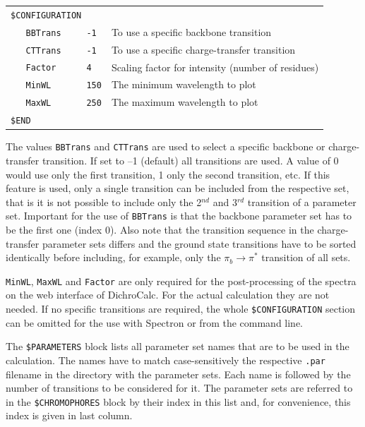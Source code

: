 \documentclass[11pt, letterpaper]{article}
\begin{document}
{\small
\begin{tabular}{p{5cm}p{12cm}}
\verb'$CONFIGURATION'          &                                                   \\
\verb'   BBTrans     -1'       & To use a specific backbone transition             \\
\verb'   CTTrans     -1'       & To use a specific charge-transfer transition      \\
\verb'   Factor      4'        & Scaling factor for intensity (number of residues) \\
\verb'   MinWL       150'      & The minimum wavelength to plot                    \\
\verb'   MaxWL       250'      & The maximum wavelength to plot                    \\
\verb'$END'                    &                                                   \\
\end{tabular}
}

The values \verb'BBTrans' and \verb'CTTrans' are used to select a specific backbone or charge-transfer transition. If set to --1 (default) all transitions are used. A value of 0 would use only the first transition, 1 only the second transition, etc. If this feature is used, only a single transition can be included from the respective set, that is it is not possible to include only the 2$^{nd}$ and 3$^{rd}$ transition of a parameter set. Important for the use of \verb'BBTrans' is that the backbone parameter set has to be the first one (index 0). Also note that the transition sequence in the charge-transfer parameter sets differs and the ground state transitions have to be sorted identically before including, for example, only the $\pi_b\rightarrow\pi^*$ transition of all sets.

\verb'MinWL', \verb'MaxWL' and \verb'Factor' are only required for the post-processing of the spectra on the web interface of DichroCalc. For the actual calculation they are not needed. If no specific transitions are required, the whole \verb'$CONFIGURATION' section can be omitted for the use with Spectron or from the command line.

The \verb'$PARAMETERS' block lists all parameter set names that are to be used in the calculation. The names have to match case-sensitively the respective \verb'.par' filename in the directory with the parameter sets. Each name is followed by the number of transitions to be considered for it. The parameter sets are referred to in the \verb'$CHROMOPHORES' block by their index in this list and, for convenience, this index is given in last column.
\end{document}
